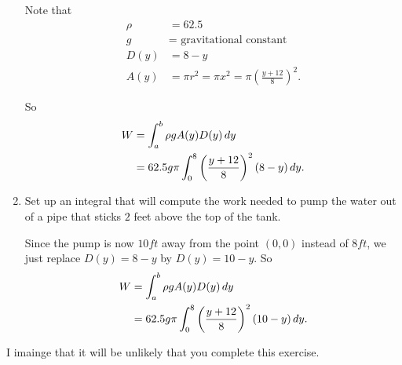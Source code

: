 \documentclass[noinstructornotes]{ximera}
\begin{document}
\begin{problem}
\begin{enumerate}
\begin{freeResponse}
		Note that
			\begin{align*}
			\rho &= 62.5  \\
			g &= \text{ gravitational constant}  \\
			D(y) &= 8-y  \\
			A(y) &= \pi r^2 = \pi x^2 = \pi \left( \frac{y+12}{8} \right)^2.
			\end{align*}
		
		So
			\begin{align*}
			W &= \int_a^b \rho g A(y) D(y) \,d y  \\
			&= 62.5 g \pi \int_0^8 \left( \frac{y+12}{8} \right)^2 (8-y) \,d y.
			\end{align*}
		\end{freeResponse}
		
		
		
		\item  Set up an integral that will compute the work needed to pump the water out of a pipe that sticks $2$ feet above the top of the tank.
		\begin{freeResponse}
		Since the pump is now $10 ft$ away from the point $(0,0)$ instead of $8 ft$, we just replace $D(y) = 8-y$ by $D(y) = 10-y$.  
		So
			\begin{align*}
			W &= \int_a^b \rho g A(y) D(y) \,d y  \\
			&= 62.5 g \pi \int_0^8 \left( \frac{y+12}{8} \right)^2 (10-y) \,d y.
			\end{align*}
		\end{freeResponse}
		
	\end{enumerate}

\end{problem}

\begin{instructorNotes}
I imainge that it will be unlikely that you complete this exercise.
\end{instructorNotes}
















	
	
	
	
	
	
	
	
	

	










								
				
				
	
\end{document}
